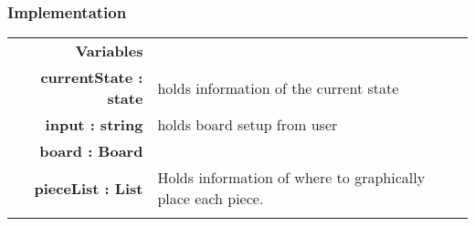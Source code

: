 \documentclass[10pt]{article}
\begin{document}
    \subsubsection{Implementation}
        \begin{tabularx}{\linewidth}{ >{\bfseries}r Xp{5cm} }
            Variables       & \begin{tabular}[t]{@{} l p{8cm}} 
                                     & \\
                                    currentState : state & holds information of the current state \\
                                    input : string & holds board setup from user \\ 
                                    board : Board & \\
                                    pieceList : List &  Holds information of where to graphically place each piece. \\
                              \end{tabular} \\


\end{tabularx}
\end{document}
